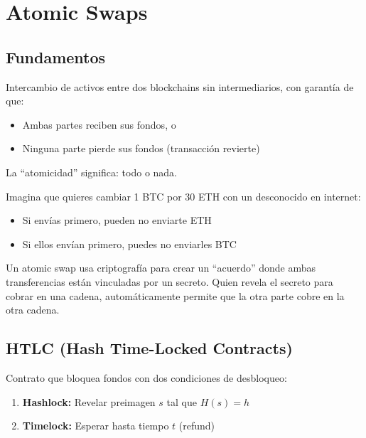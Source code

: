 \documentclass[11pt,a4paper,twoside]{book}
\begin{document}
\section{Atomic Swaps}
\label{sec:atomicswaps}

\subsection{Fundamentos}

\begin{definition}
Intercambio de activos entre dos blockchains sin intermediarios, con garant\'ia de que:
\begin{itemize}
    \item Ambas partes reciben sus fondos, o
    \item Ninguna parte pierde sus fondos (transacci\'on revierte)
\end{itemize}

La ``atomicidad'' significa: todo o nada.
\end{definition}

\begin{intuicion}
Imagina que quieres cambiar 1 BTC por 30 ETH con un desconocido en internet:
\begin{itemize}
    \item Si env\'ias primero, pueden no enviarte ETH
    \item Si ellos env\'ian primero, puedes no enviarles BTC
\end{itemize}

Un atomic swap usa criptograf\'ia para crear un ``acuerdo'' donde ambas transferencias est\'an vinculadas por un secreto. Quien revela el secreto para cobrar en una cadena, autom\'aticamente permite que la otra parte cobre en la otra cadena.
\end{intuicion}

\subsection{HTLC (Hash Time-Locked Contracts)}

\begin{definition}[HTLC]
Contrato que bloquea fondos con dos condiciones de desbloqueo:
\begin{enumerate}
    \item \textbf{Hashlock:} Revelar preimagen $s$ tal que $H(s) = h$
    \item \textbf{Timelock:} Esperar hasta tiempo $t$ (refund)
\end{enumerate}
\end{definition}
\end{document}
